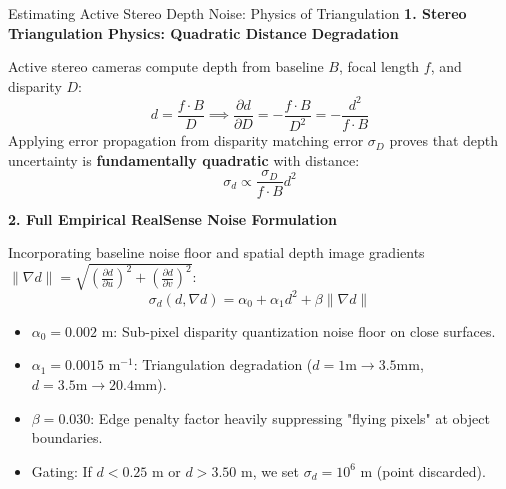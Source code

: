 \documentclass[aspectratio=169, 10pt]{beamer}
\begin{document}
\begin{frame}{Estimating Active Stereo Depth Noise: Physics of Triangulation}
  {\normalsize \textbf{\textcolor{NavyBlue}{1. Stereo Triangulation Physics: Quadratic Distance Degradation}}}
  \vspace{0.1cm}

  Active stereo cameras compute depth from baseline $B$, focal length $f$, and disparity $D$:
  \begin{equation}
    d = \frac{f \cdot B}{D} \implies \frac{\partial d}{\partial D} = -\frac{f \cdot B}{D^2} = -\frac{d^2}{f \cdot B}
  \end{equation}
  Applying error propagation from disparity matching error $\sigma_D$ proves that depth uncertainty is \textbf{fundamentally quadratic} with distance:
  \begin{equation}
    \sigma_d \propto \frac{\sigma_D}{f \cdot B} d^2
  \end{equation}

  \vspace{0.2cm}
  {\normalsize \textbf{\textcolor{NavyBlue}{2. Full Empirical RealSense Noise Formulation}}}
  \vspace{0.1cm}

  Incorporating baseline noise floor and spatial depth image gradients $\|\nabla d\| = \sqrt{(\frac{\partial d}{\partial u})^2 + (\frac{\partial d}{\partial v})^2}$:
  \begin{equation}
    \sigma_d(d, \nabla d) = \alpha_0 + \alpha_1 d^2 + \beta \|\nabla d\|
  \end{equation}
  \begin{itemize}
    \setlength{\itemsep}{2pt}
    \item $\alpha_0 = 0.002\text{ m}$: Sub-pixel disparity quantization noise floor on close surfaces.
    \item $\alpha_1 = 0.0015\text{ m}^{-1}$: Triangulation degradation ($d=1\text{m} \rightarrow 3.5\text{mm}$, $d=3.5\text{m} \rightarrow 20.4\text{mm}$).
    \item $\beta = 0.030$: Edge penalty factor heavily suppressing "flying pixels" at object boundaries.
    \item Gating: If $d < 0.25\text{ m}$ or $d > 3.50\text{ m}$, we set $\sigma_d = 10^6\text{ m}$ (point discarded).
  \end{itemize}
\end{frame}
\end{document}
